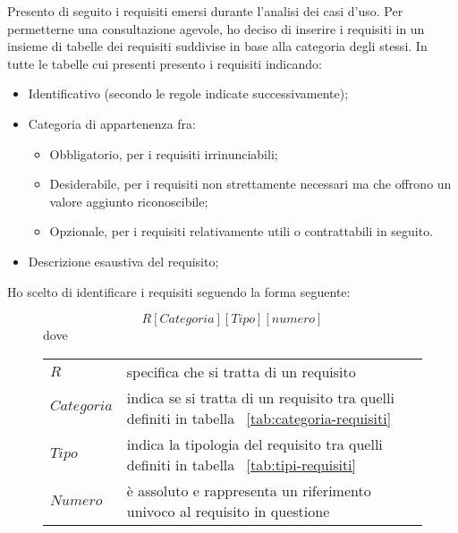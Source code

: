 Presento di seguito i requisiti emersi durante l’analisi dei casi d’uso.
Per permetterne una consultazione agevole, ho deciso di inserire i requisiti in un insieme di tabelle dei requisiti suddivise in base alla categoria degli stessi.
In tutte le tabelle cui presenti presento i requisiti indicando:
\begin{itemize}
	\item Identificativo (secondo le regole indicate successivamente);
	\item Categoria di appartenenza fra:
	\begin{itemize}
		\item Obbligatorio, per i requisiti irrinunciabili;
		\item Desiderabile, per i requisiti non strettamente necessari ma che offrono un
    valore aggiunto riconoscibile;
		\item Opzionale, per i requisiti relativamente utili o contrattabili in seguito.
	\end{itemize}
	\item Descrizione esaustiva del requisito;
\end{itemize}
\smallskip

\newenvironment{conditions}
  {\par\vspace{\abovedisplayskip}\noindent\begin{tabular}{>{$}l<{$} @{${}={}$} l}}
  {\end{tabular}\par\vspace{\belowdisplayskip}}

Ho scelto di identificare i requisiti seguendo la forma seguente:

\begin{figure}[H]
  \centering
  \[ R[Categoria][Tipo][numero] \]
	dove
	\begin{conditions}
    R & specifica che si tratta di un requisito\\
    Categoria & indica se si tratta di un requisito tra quelli definiti in tabella ~\ref{tab:categoria-requisiti}\\
    Tipo & indica la tipologia del requisito tra quelli definiti in tabella ~\ref{tab:tipi-requisiti}\\
		Numero & è assoluto e rappresenta un riferimento univoco al requisito in questione\\
	\end{conditions}
\end{figure}

